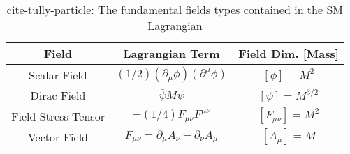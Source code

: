 \begin{center}
\begin{table}[]
\begin{center}
\caption{cite-tully-particle: The fundamental fields types contained in the SM Lagrangian}
\begin{tabular}{ccc}
Field & Lagrangian Term & Field Dim. [Mass]\\
\hline
Scalar Field & $(1/2)(\partial_\mu \phi)(\partial^\mu \phi)$ & $[\phi]=M^2$\\
Dirac Field & $\bar \psi M \psi$  & $[\psi]=M^{3/2}$\\
Field Stress Tensor &$-(1/4)F_{\mu\nu}F^{\mu\nu}$ & $[F_{\mu\nu}]=M^2$ \\
Vector Field & $F_{\mu\nu} = \partial_\mu A_\nu - \partial_\nu A_\mu$ & $[A_\mu]=M$\\
\end{tabular}
\label{tab:fields}
\end{center}
\end{table}
\end{center}
